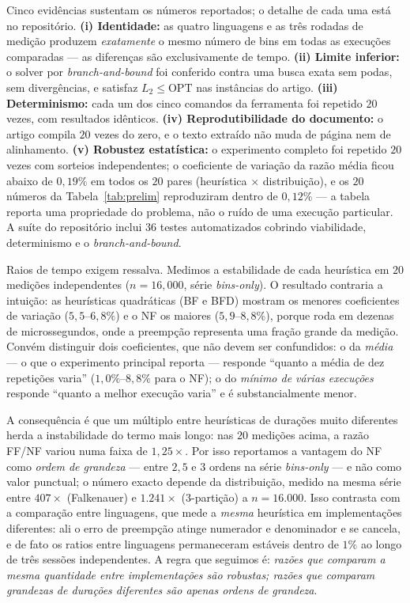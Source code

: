 \documentclass[12pt]{article}
\begin{document}
Cinco evidências sustentam os números reportados; o detalhe de cada uma está no repositório. \textbf{(i) Identidade:} as quatro linguagens e as três rodadas de medição produzem \emph{exatamente} o mesmo número de bins em todas as execuções comparadas --- as diferenças são exclusivamente de tempo. \textbf{(ii) Limite inferior:} o solver por \emph{branch-and-bound} foi conferido contra uma busca exata sem podas, sem divergências, e satisfaz $L_2 \leq \mathrm{OPT}$ nas instâncias do artigo. \textbf{(iii) Determinismo:} cada um dos cinco comandos da ferramenta foi repetido $20$ vezes, com resultados idênticos. \textbf{(iv) Reprodutibilidade do documento:} o artigo compila $20$ vezes do zero, e o texto extraído não muda de página nem de alinhamento. \textbf{(v) Robustez estatística:} o experimento completo foi repetido $20$ vezes com sorteios independentes; o coeficiente de variação da razão média ficou abaixo de $0{,}19\%$ em todos os $20$ pares (heurística $\times$ distribuição), e os $20$ números da Tabela~\ref{tab:prelim} reproduziram dentro de $0{,}12\%$ --- a tabela reporta uma propriedade do problema, não o ruído de uma execução particular. A suíte do repositório inclui $36$ testes automatizados cobrindo viabilidade, determinismo e o \emph{branch-and-bound}.

Raios de tempo exigem ressalva. Medimos a estabilidade de cada heurística em $20$ medições independentes ($n = 16{,}000$, série \textit{bins-only}). O resultado contraria a intuição: as heurísticas quadráticas (BF e BFD) mostram os menores coeficientes de variação ($5{,}5$--$6{,}8\%$) e o NF os maiores ($5{,}9$--$8{,}8\%$), porque roda em dezenas de microssegundos, onde a preempção representa uma fração grande da medição. Convém distinguir dois coeficientes, que não devem ser confundidos: o da \emph{média} --- o que o experimento principal reporta --- responde ``quanto a média de dez repetições varia'' ($1{,}0\%$--$8{,}8\%$ para o NF); o do \emph{mínimo de várias execuções} responde ``quanto a melhor execução varia'' e é substancialmente menor.

A consequência é que um múltiplo entre heurísticas de durações muito diferentes herda a instabilidade do termo mais longo: nas $20$ medições acima, a razão FF/NF variou numa faixa de $1{,}25\times$. Por isso reportamos a vantagem do NF como \emph{ordem de grandeza} --- entre $2{,}5$ e $3$ ordens na série \textit{bins-only} --- e não como valor punctual; o número exacto depende da distribuição, medido na mesma série entre $407\times$ (Falkenauer) e $1.241\times$ (3-partição) a $n = 16.000$. Isso contrasta com a comparação entre linguagens, que mede a \emph{mesma} heurística em implementações diferentes: ali o erro de preempção atinge numerador e denominador e se cancela, e de fato os ratios entre linguagens permaneceram estáveis dentro de $1\%$ ao longo de três sessões independentes. A regra que seguimos é: \emph{razões que comparam a mesma quantidade entre implementações são robustas; razões que comparam grandezas de durações diferentes são apenas ordens de grandeza}.
\end{document}
